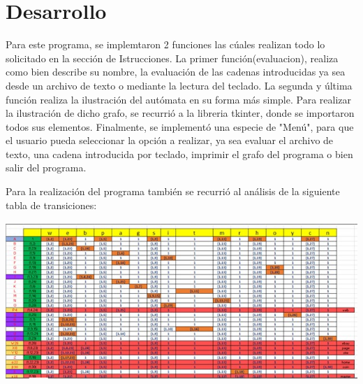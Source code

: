 \documentclass{article}
\begin{document}
	\section*{Desarrollo}
	Para este programa, se implemtaron 2 funciones las cúales realizan todo lo solicitado en la sección de Istrucciones.
	La primer función(evaluacion), realiza como bien describe su nombre, la evaluación de las cadenas introducidas ya sea desde un archivo de texto o mediante la lectura del teclado. 	
	La segunda y última función realiza la ilustración del autómata en su forma más simple. Para realizar la ilustración de dicho grafo, se recurrió a la libreria tkinter, donde se importaron todos sus elementos.	
	Finalmente, se implementó una especie de "Menú", para que el usuario pueda seleccionar la opción a realizar, ya sea evaluar el archivo de texto, una cadena introducida por teclado, imprimir el grafo del programa o bien salir del programa.
	
	Para la realización del programa también se recurrió al análisis de la siguiente tabla de transiciones:	
	
				\includegraphics[height = 6cm]{tabla.jpg}		
	
\end{document}
